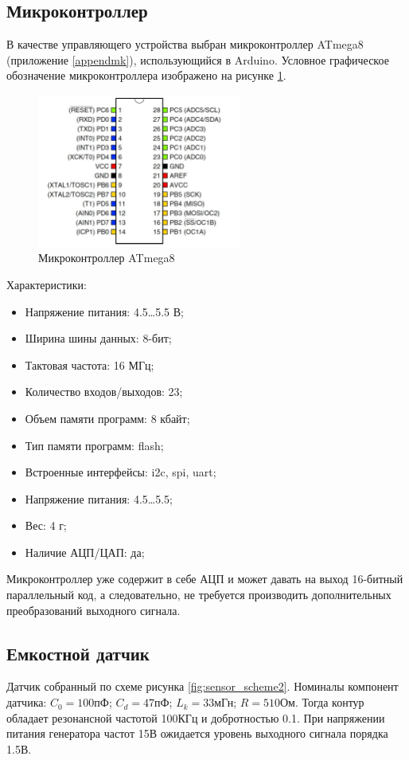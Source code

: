 \subsection{Микроконтроллер}
В качестве управляющего устройства выбран микроконтроллер ATmega8 (приложение \ref{appendmk}), использующийся в Arduino. Условное графическое обозначение микроконтроллера изображено
на рисунке \ref{fig:mk}.
\begin{figure}[ht]
	\centering
	\includegraphics[width=0.6\textwidth]{./images/mk.png}
	\caption{Микроконтроллер ATmega8}
	\label{fig:mk}
\end{figure}
Характеристики:
\begin{itemize}
    \item Напряжение питания: 4.5…5.5 В;
    \item Ширина шины данных: 8-бит;
    \item Тактовая частота:	16 МГц;
    \item Количество входов/выходов: 23;
    \item Объем памяти программ: 8 кбайт;
    \item Тип памяти программ: flash;
    \item Встроенные интерфейсы: i2c, spi, uart;
    \item Напряжение питания: 4.5…5.5;
    \item Вес: 4 г;
    \item Наличие АЦП/ЦАП: да;
\end{itemize}
Микроконтроллер уже содержит в себе АЦП и может
давать на выход 16-битный параллельный код, а следовательно, не
требуется производить дополнительных преобразований выходного сигнала.


\subsection{Емкостной датчик}
Датчик собранный по схеме рисунка \ref{fig:sensor_scheme2}. Номиналы компонент датчика:
\(C_0 = 100\)пФ; \(C_d = 47\)пФ; \(L_k = 33\)мГн; \(R=510\)Ом.
Тогда контур обладает резонансной частотой 100КГц и добротностью 0.1. При напряжении питания генератора частот 15В ожидается уровень выходного сигнала порядка 1.5В.


